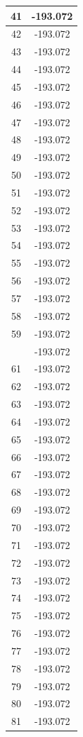 \documentclass[12pt,a4paper]{article}
\numberwithin{equation}{section}
\numberwithin{figure}{section}
\numberwithin{table}{section}
\begin{document}
\begin{longtable}{|c|c|}
41 & -193.072 \\ \hline
42 & -193.072 \\ \hline
43 & -193.072 \\ \hline
44 & -193.072 \\ \hline
45 & -193.072 \\ \hline
46 & -193.072 \\ \hline
47 & -193.072 \\ \hline
48 & -193.072 \\ \hline
49 & -193.072 \\ \hline
50 & -193.072 \\ \hline
51 & -193.072 \\ \hline
52 & -193.072 \\ \hline
53 & -193.072 \\ \hline
54 & -193.072 \\ \hline
55 & -193.072 \\ \hline
56 & -193.072 \\ \hline
57 & -193.072 \\ \hline
58 & -193.072 \\ \hline
59 & -193.072 \\ \hline
\pagebreak
60 & -193.072 \\ \hline
61 & -193.072 \\ \hline
62 & -193.072 \\ \hline
63 & -193.072 \\ \hline
64 & -193.072 \\ \hline
65 & -193.072 \\ \hline
66 & -193.072 \\ \hline
67 & -193.072 \\ \hline
68 & -193.072 \\ \hline
69 & -193.072 \\ \hline
70 & -193.072 \\ \hline
71 & -193.072 \\ \hline
72 & -193.072 \\ \hline
73 & -193.072 \\ \hline
74 & -193.072 \\ \hline
75 & -193.072 \\ \hline
76 & -193.072 \\ \hline
77 & -193.072 \\ \hline
78 & -193.072 \\ \hline
79 & -193.072 \\ \hline
80 & -193.072 \\ \hline
81 & -193.072 \\ \hline

\end{longtable}
\end{document}
